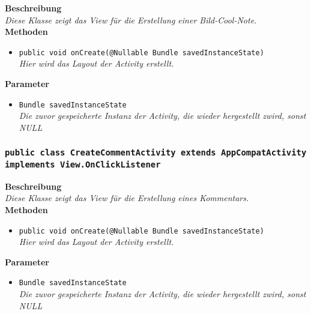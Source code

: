                	\textbf{Beschreibung} \\
      	        \textit{Diese Klasse zeigt das View für die Erstellung einer Bild-Cool-Note.} \\
                
                \textbf{Methoden}
                \begin{itemize}
        		\item\texttt{{public void onCreate(@Nullable Bundle savedInstanceState)}}\\
                \textit{Hier wird das Layout der Activity erstellt.}\\
                \end{itemize}
                
                \textbf{Parameter}
                \begin{itemize}
        		\item\texttt{Bundle savedInstanceState}\\ 
                \textit{Die zuvor gespeicherte Instanz der Activity, die wieder hergestellt zwird, sonst NULL}\\
                \end{itemize} 
        
        \subsubsection{\texttt{public class CreateCommentActivity extends AppCompatActivity implements View.OnClickListener}}
               
               	\textbf{Beschreibung} \\
      	        \textit{Diese Klasse zeigt das View für die Erstellung eines Kommentars.} \\
                
                \textbf{Methoden}
                \begin{itemize}
        		\item\texttt{{public void onCreate(@Nullable Bundle savedInstanceState)}}\\
                \textit{Hier wird das Layout der Activity erstellt.}\\
                \end{itemize}
                
                \textbf{Parameter}
                \begin{itemize}
        		\item\texttt{Bundle savedInstanceState}\\  
                \textit{Die zuvor gespeicherte Instanz der Activity, die wieder hergestellt zwird, sonst NULL}\\
                \end{itemize} 
                
